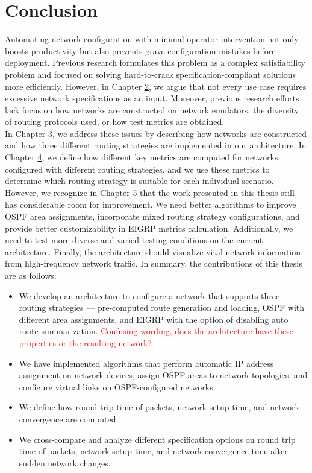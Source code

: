 \documentclass{uiucthesis2021}
\begin{document}
\chapter{Conclusion}
\label{c6}

\noindent Automating network configuration with minimal operator intervention not only boosts productivity but also prevents grave configuration mistakes before deployment. Previous research formulates this problem as a complex satisfiability problem and focused on solving hard-to-crack specification-compliant solutions more efficiently. However, in Chapter \hyperref[c2]{2}, we argue that not every use case requires excessive network specifications as an input. Moreover, previous research efforts lack focus on how networks are constructed on network emulators, the diversity of routing protocols used, or how test metrics are obtained.\\

\noindent In Chapter \hyperref[c3]{3}, we address these issues by describing how networks are constructed and how three different routing strategies are implemented in our architecture. In Chapter \hyperref[c4]{4}, we define how different key metrics are computed for networks configured with different routing strategies, and we use these metrics to determine which routing strategy is suitable for each individual scenario. However, we recognize in Chapter \hyperref[c5]{5} that the work presented in this thesis still has considerable room for improvement. We need better algorithms to improve OSPF area assignments, incorporate mixed routing strategy configurations, and provide better customizability in EIGRP metrics calculation. Additionally, we need to test more diverse and varied testing conditions on the current architecture. Finally, the architecture should visualize vital network information from high-frequency network traffic. In summary, the contributions of this thesis are as follows:

\begin{itemize}
    \item We develop an architecture to configure a network that supports three routing strategies --- pre-computed route generation and loading, OSPF with different area assignments, and EIGRP with the option of disabling auto route summarization. \textcolor{red}{Confusing wording, does the architecture have these properties or the resulting network?}
    \item We have implemented algorithms that perform automatic IP address assignment on network devices, assign OSPF areas to network topologies, and configure virtual links on OSPF-configured networks. 
    \item We define how round trip time of packets, network setup time, and network convergence are computed.
    \item We cross-compare and analyze different specification options on round trip time of packets, network setup time, and network convergence time after sudden network changes.  
\end{itemize}
\end{document}
